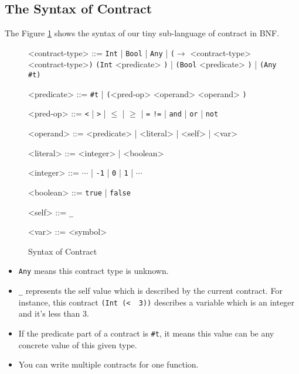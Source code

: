 \documentclass[paper=a4, fontsize=11pt]{scrartcl} %
\numberwithin{equation}{section} %
\numberwithin{figure}{section} %
\numberwithin{table}{section} %
\begin{document}
\subsection{The Syntax of Contract}
The Figure \ref{figc} shows the syntax of our tiny sub-language of contract in BNF.
\begin{figure}[h!]
\setlength{\grammarparsep}{7pt plus 1pt minus 1pt} %
\setlength{\grammarindent}{8em} %
\begin{grammar}
<contract-type> ::= \texttt{Int} | \texttt{Bool} | \texttt{Any} | \texttt{($\rightarrow$} <contract-type> <contract-type>\texttt{)}
\alt \texttt{(Int} <predicate> \texttt{)} | \texttt{(Bool} <predicate> \texttt{)} | \texttt{(Any \#t)}

<predicate> ::= \texttt{\#t} | \texttt{(}<pred-op> <operand> <operand> \texttt{)}

<pred-op> ::= \texttt{\textless} | \texttt{\textgreater} | \texttt{$\leq$} | \texttt{$\geq$} | \texttt{=}
\alt \texttt{!=} | \texttt{and} | \texttt{or} | \texttt{not}

<operand> ::= <predicate> | <literal> | <self> | <var>


<literal> ::= <integer> | <boolean>

<integer> ::= $\cdots$ | \texttt{-1} | \texttt{0} | \texttt{1} | $\cdots$

<boolean> ::= \texttt{true} | \texttt{false}

<self> ::= \texttt{_}

<var> ::= <symbol>
\end{grammar}
\caption{Syntax of Contract}
\label{figc}
\end{figure}

\begin{itemize}
\item \texttt{Any} means this contract type is unknown.

\item \texttt{_} represents the self value which is described by the current contract. For instance, this contract \texttt{(Int\ (\textless\ \underscore\ 3))} describes a variable which is an integer and it's less than 3.

\item If the predicate part of a contract is \texttt{\#t}, it means this value can be any concrete value of this given type.

\item You can write multiple contracts for one function.
\end{itemize}
\end{document}
